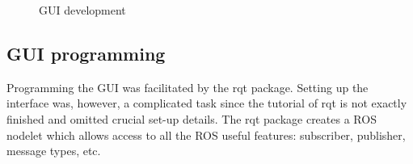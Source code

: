 \documentclass[11pt,a4paper]{article}
\begin{document}
\begin{figure}[ht!]%
	\centering
    \qquad  
    \qquad  
    \caption{GUI development}
    \label{fig:gui}
\end{figure}

\subsection{GUI programming}
Programming the GUI was facilitated by the rqt package. Setting up the interface was, however,
 a complicated task since the tutorial of rqt is not exactly finished and omitted crucial set-up details. The rqt package creates a ROS nodelet which allows access to
all the ROS useful features: subscriber, publisher, message types, etc.
\end{document}
